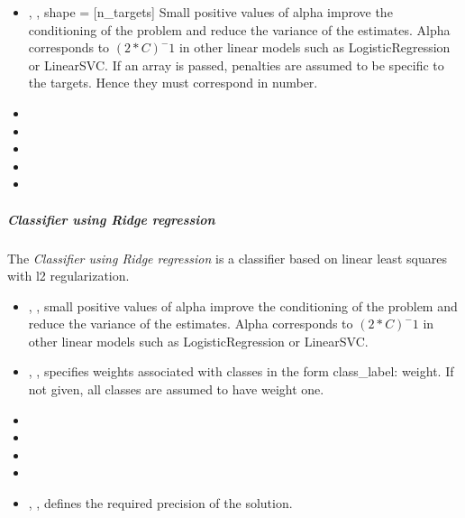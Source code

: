 %
\begin{itemize}
  \item {}, ,
  shape = [n\_targets] Small positive values of alpha improve the
  conditioning of the problem and reduce the variance of the estimates.
  Alpha corresponds to $(2*C)^-1$ in other linear models such as
  LogisticRegression or LinearSVC.
  If an array is passed, penalties are assumed to be specific to the targets.
  Hence they must correspond in number.
  \item {}
  \item {}
  \item {}
  \item {}
  \item \solverDescription
\end{itemize}

\subparagraph{Classifier using Ridge regression}
\mbox{}

The \textit{Classifier using Ridge regression} is a classifier based on linear
least squares with l2 regularization.

\begin{itemize}
  \item {}, , small positive values of alpha improve
  the conditioning of the problem and reduce the variance of the estimates.
  Alpha corresponds to $(2*C)^-1$ in other linear models such as
  LogisticRegression or LinearSVC.
  \item {}, , specifies
  weights associated with classes in the form {class\_label: weight}.
  If not given, all classes are assumed to have weight one.
  \item {}
  \item {}
  \item {}
  \item \solverDescription
  \item {}, , defines the required precision of the
  solution.
\end{itemize}

